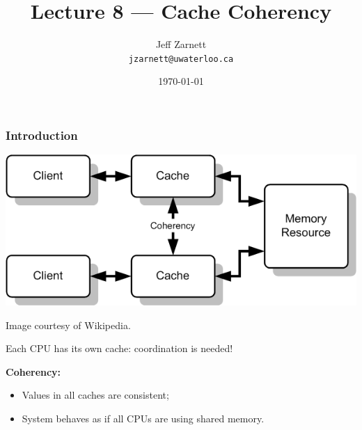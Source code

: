 

\title{Lecture 8 --- Cache Coherency }

\author{Jeff Zarnett \\ \small \texttt{jzarnett@uwaterloo.ca}}
\date{\today}




\begin{frame}
  \titlepage

 \end{frame}

\begin{frame}
  \frametitle{Introduction}

  \begin{center}
    \includegraphics[scale=0.7]{images/coherency}

    Image courtesy of Wikipedia.
  \end{center}

Each CPU has its own cache: coordination is needed!
  
  {\bf Coherency:}
  \begin{itemize}
    \item Values in all caches are consistent;
    \item System behaves as if all CPUs are using shared memory.
  \end{itemize}
  
\end{frame}

